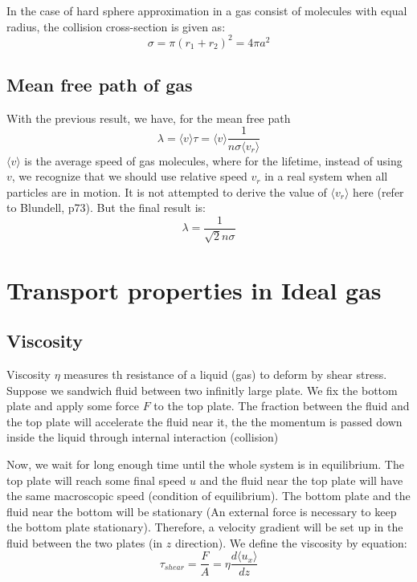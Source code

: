 \documentclass{article}
\begin{document}
In the case of hard sphere approximation in a gas consist of molecules with
equal radius, the collision cross-section is given as:
\begin{equation}
    \sigma = \pi (r_1 + r_2) ^ 2 = 4 \pi a^2
\end{equation}

\subsection*{Mean free path of gas}
With the previous result, we have, for the mean free path
\begin{equation}
    \lambda = \langle v \rangle \tau = \langle v \rangle \frac{1}{n\sigma \langle v_r\rangle }
\end{equation}
$\langle v \rangle$ is the average speed of gas molecules,
where for the lifetime, instead of using $v$, we recognize that we should use 
relative speed $v_r$ in a real system when all particles are in motion. It is not attempted to derive
the value of $\langle v_r\rangle$ here (refer to Blundell, p73). But the final result
is: 
\begin{equation}
    \lambda = \frac{1}{\sqrt{2}n\sigma}
\end{equation}

\section{Transport properties in Ideal gas}

\subsection{Viscosity}
Viscosity $\eta$ measures th resistance of a liquid (gas) to deform by shear stress. Suppose we sandwich fluid between 
two infinitly large plate. We fix the bottom plate and apply some force $F$ to the top plate. The fraction between the fluid and 
the top plate will accelerate the fluid near it, the the momentum is passed down inside the liquid through internal interaction (collision)

Now, we wait for long enough time until the whole system is in equilibrium. The top plate will reach some final speed $u$ and 
the fluid near the top plate will have the same macroscopic speed (condition of equilibrium). The bottom plate and the fluid near the bottom 
will be stationary (An external force is necessary to keep the bottom plate stationary). 
Therefore, a velocity gradient will be set up in the fluid between the two plates (in $z$ direction). We define 
the viscosity by equation:
\begin{equation}
    \tau_{shear} = \frac{F}{A} = \eta \frac{d \langle u_x \rangle}{dz}
\end{equation}
\end{document}
